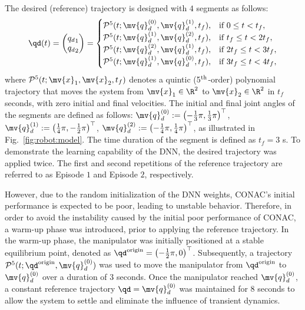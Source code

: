 \documentclass[journal]{IEEEtran}
\begin{document}
The desired (reference) trajectory is designed with $4$ segments as follows:
\begin{equation}
    \qd(t) 
    =
    \begin{pmatrix}
        {q_d}_1
        \\
        {q_d}_2
    \end{pmatrix}
    =
    \begin{cases}
    \mathcal{P}^5(t;\mv{q}_d^{(0)},\mv{q}_d^{(1)},t_f),
        &
        \text{if } 0 \le t < t_f 
        ,
        \\
    \mathcal{P}^5(t;\mv{q}_d^{(1)},\mv{q}_d^{(2)},t_f),
        &
        \text{if } t_f \le t < 2t_f 
        ,
        \\
    \mathcal{P}^5(t;\mv{q}_d^{(2)},\mv{q}_d^{(1)},t_f),
        & 
        \text{if } 2t_f \le t < 3t_f 
        ,
        \\
    \mathcal{P}^5(t;\mv{q}_d^{(1)},\mv{q}_d^{(0)},t_f),
        &    
        \text{if } 3t_f \le t < 4t_f 
        ,
        \\
    \end{cases} 
    \label{eq:desired trajectory}
\end{equation}
where $\mathcal{P}^5(t;\mv{x}_1,\mv{x}_2,t_f)$ denotes a quintic (5$\textsuperscript{th}$-order) polynomial trajectory that moves the system from $\mv{x}_1\in\R^2$ to $\mv{x}_2\in\R^2$ in $t_f$ seconds, with zero initial and final velocities.
The initial and final joint angles of the segments are defined as follows:
$
    \mv{q}_d^{(0)}:=\left(-\tfrac{1}{3}\pi,\tfrac{1}{3}\pi\right)^\top
$, 
$
    \mv{q}_d^{(1)}:=\left(\tfrac{1}{4}\pi,-\tfrac{1}{2}\pi\right)^\top
$, 
$
    \mv{q}_d^{(2)}:=\left(-\tfrac{1}{4}\pi,\tfrac{1}{4}\pi\right)^\top
$, as illustrated in Fig.~\ref{fig:robot:model}.
The time duration of the segment is defined as $t_f=3$ s.
To demonstrate the learning capability of the DNN, the desired trajectory was applied twice. 
The first and second repetitions of the reference trajectory are referred to as Episode $1$ and Episode $2$, respectively.

However, due to the random initialization of the DNN weights, CONAC's initial performance is expected to be poor, leading to unstable behavior.
Therefore, in order to avoid the instability caused by the initial poor performance of CONAC, a warm-up phase was introduced, prior to applying the reference trajectory.
In the warm-up phase, the manipulator was initially positioned at a stable equilibrium point, denoted as ${\qd}^{\rm{origin}} = \left(-\tfrac{1}{2}\pi, 0\right)^\top$.
Subsequently, a trajectory $\mathcal{P}^5(t; {\qd}^{\rm{origin}}, \mv{q}_d^{(0)})$ was used to move the manipulator from ${\qd}^{\rm{origin}}$ to $\mv{q}_d^{(0)}$ over a duration of 3 seconds.
Once the manipulator reached $\mv{q}_d^{(0)}$, a constant reference trajectory $\qd = \mv{q}_d^{(0)}$ was maintained for 8 seconds to allow the system to settle and eliminate the influence of transient dynamics.
\end{document}
